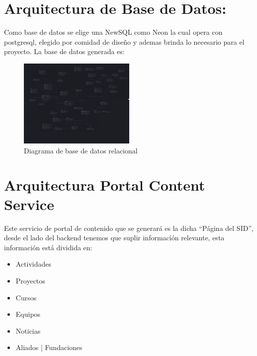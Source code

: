 \documentclass[11pt,a4paper]{article}
\begin{document}
\section{Arquitectura de Base de Datos: }
Como base de datos se elige una NewSQL como Neon la cual opera con postgresql, elegido por comidad de diseño y ademas brinda lo necesario para el proyecto.
La base de datos generada es:
\begin{figure}[H]
	\centering
	\includegraphics[width=0.5\textwidth]{src/ModeloTerminado.pdf}
	\caption{Diagrama de base de datos relacional}
\end{figure}

\section{Arquitectura Portal Content Service}
Este servicio de portal de contenido que se generará es la dicha ``Página del SID'', desde el lado del backend tenemos que suplir información relevante,
esta información está dividida en:
\begin{itemize}
	\item Actividades
	\item Proyectos
	\item Cursos
	\item Equipos
	\item Noticias
	\item Aliados | Fundaciones
\end{itemize}
\end{document}
